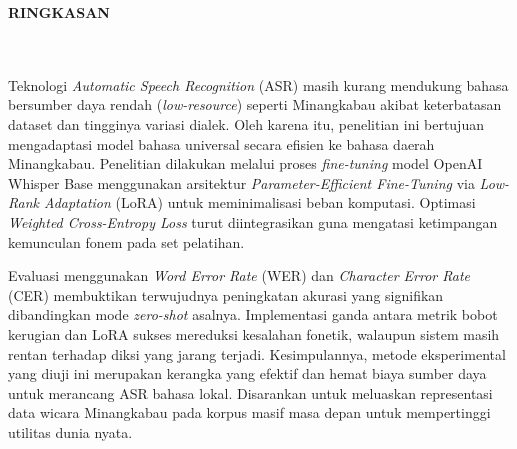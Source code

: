 \clearpage
{}%
\thispagestyle{fancy}

\begin{center}
	\large \bfseries \MakeUppercase{Ringkasan}\\
	\normalsize \normalfont {\thetitle}\\
	\normalsize \normalfont {\theauthor}\\
	\bigskip
	
	\normalsize \normalfont \justifying
	\normalsize \normalfont \justifying
	Teknologi \textit{Automatic Speech Recognition} (ASR) masih kurang mendukung bahasa bersumber daya rendah (\textit{low-resource}) seperti Minangkabau akibat keterbatasan dataset dan tingginya variasi dialek. Oleh karena itu, penelitian ini bertujuan mengadaptasi model bahasa universal secara efisien ke bahasa daerah Minangkabau. Penelitian dilakukan melalui proses \textit{fine-tuning} model OpenAI Whisper Base menggunakan arsitektur \textit{Parameter-Efficient Fine-Tuning} via \textit{Low-Rank Adaptation} (LoRA) untuk meminimalisasi beban komputasi. Optimasi \textit{Weighted Cross-Entropy Loss} turut diintegrasikan guna mengatasi ketimpangan kemunculan fonem pada set pelatihan.

	Evaluasi menggunakan \textit{Word Error Rate} (WER) dan \textit{Character Error Rate} (CER) membuktikan terwujudnya peningkatan akurasi yang signifikan dibandingkan mode \textit{zero-shot} asalnya. Implementasi ganda antara metrik bobot kerugian dan LoRA sukses mereduksi kesalahan fonetik, walaupun sistem masih rentan terhadap diksi yang jarang terjadi. Kesimpulannya, metode eksperimental yang diuji ini merupakan kerangka yang efektif dan hemat biaya sumber daya untuk merancang ASR bahasa lokal. Disarankan untuk meluaskan representasi data wicara Minangkabau pada korpus masif masa depan untuk mempertinggi utilitas dunia nyata.

	\vfill
	
\end{center}
\clearpage
\null
\thispagestyle{empty}
\newpage
\clearpage